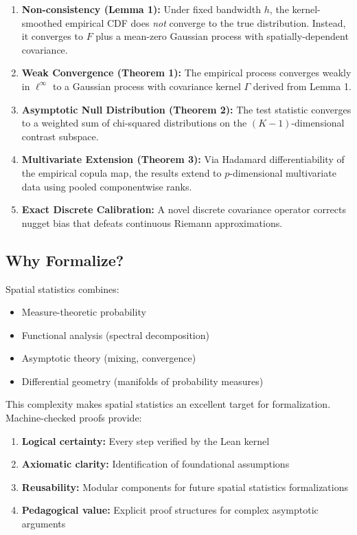 \documentclass[11pt,a4paper]{article}
\theoremstyle{definition}
\begin{document}
\begin{enumerate}
\item \textbf{Non-consistency (Lemma 1):} Under fixed bandwidth $h$, the kernel-smoothed empirical CDF does \emph{not} converge to the true distribution. Instead, it converges to $F$ plus a mean-zero Gaussian process with spatially-dependent covariance.

\item \textbf{Weak Convergence (Theorem 1):} The empirical process converges weakly in $\ell^\infty$ to a Gaussian process with covariance kernel $\Gamma$ derived from Lemma 1.

\item \textbf{Asymptotic Null Distribution (Theorem 2):} The test statistic converges to a weighted sum of chi-squared distributions on the $(K{-}1)$-dimensional contrast subspace.

\item \textbf{Multivariate Extension (Theorem 3):} Via Hadamard differentiability of the empirical copula map, the results extend to $p$-dimensional multivariate data using pooled componentwise ranks.

\item \textbf{Exact Discrete Calibration:} A novel discrete covariance operator corrects nugget bias that defeats continuous Riemann approximations.
\end{enumerate}

\subsection{Why Formalize?}

Spatial statistics combines:
\begin{itemize}
\item Measure-theoretic probability
\item Functional analysis (spectral decomposition)
\item Asymptotic theory (mixing, convergence)
\item Differential geometry (manifolds of probability measures)
\end{itemize}

This complexity makes spatial statistics an excellent target for formalization. Machine-checked proofs provide:

\begin{enumerate}
\item \textbf{Logical certainty:} Every step verified by the Lean kernel
\item \textbf{Axiomatic clarity:} Identification of foundational assumptions
\item \textbf{Reusability:} Modular components for future spatial statistics formalizations
\item \textbf{Pedagogical value:} Explicit proof structures for complex asymptotic arguments
\end{enumerate}
\end{document}
